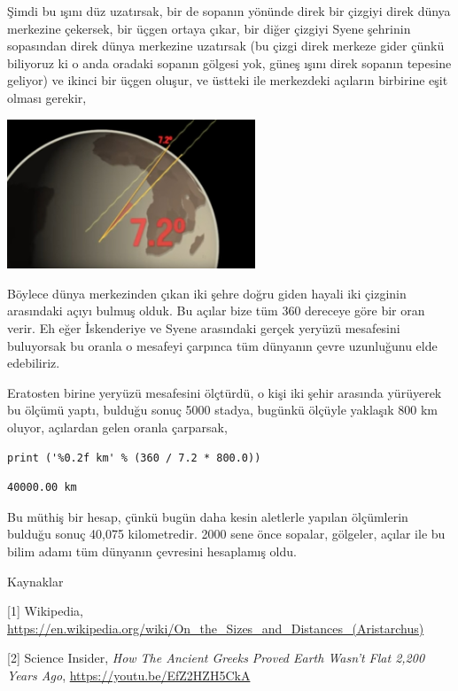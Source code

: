 \documentclass[12pt,fleqn]{article}\usepackage{../../common}
\begin{document}
Şimdi bu ışını düz uzatırsak, bir de sopanın yönünde direk bir çizgiyi direk
dünya merkezine çekersek, bir üçgen ortaya çıkar, bir diğer çizgiyi Syene
şehrinin sopasından direk dünya merkezine uzatırsak (bu çizgi direk merkeze
gider çünkü biliyoruz ki o anda oradaki sopanın gölgesi yok, güneş ışını direk
sopanın tepesine geliyor) ve ikinci bir üçgen oluşur, ve üstteki ile merkezdeki
açıların birbirine eşit olması gerekir,

\includegraphics[width=20em]{circum2.jpg}

Böylece dünya merkezinden çıkan iki şehre doğru giden hayali iki çizginin
arasındaki açıyı bulmuş olduk. Bu açılar bize tüm 360 dereceye göre bir oran
verir. Eh eğer İskenderiye ve Syene arasındaki gerçek yeryüzü mesafesini
buluyorsak bu oranla o mesafeyi çarpınca tüm dünyanın çevre uzunluğunu elde
edebiliriz.

Eratosten birine yeryüzü mesafesini ölçtürdü, o kişi iki şehir arasında
yürüyerek bu ölçümü yaptı, bulduğu sonuç 5000 stadya, bugünkü ölçüyle yaklaşık
800 km oluyor, açılardan gelen oranla çarparsak,

\begin{verbatim}
print ('%0.2f km' % (360 / 7.2 * 800.0))
\end{verbatim}

\begin{verbatim}
40000.00 km
\end{verbatim}

Bu müthiş bir hesap, çünkü bugün daha kesin aletlerle yapılan ölçümlerin bulduğu
sonuç 40,075 kilometredir. 2000 sene önce sopalar, gölgeler, açılar ile bu
bilim adamı tüm dünyanın çevresini hesaplamış oldu.

Kaynaklar

[1] Wikipedia,
    \url{https://en.wikipedia.org/wiki/On_the_Sizes_and_Distances_(Aristarchus)}

[2] Science Insider, {\em How The Ancient Greeks Proved Earth Wasn't Flat 2,200 Years Ago},
    \url{https://youtu.be/EfZ2HZH5CkA}
    
\end{document}
